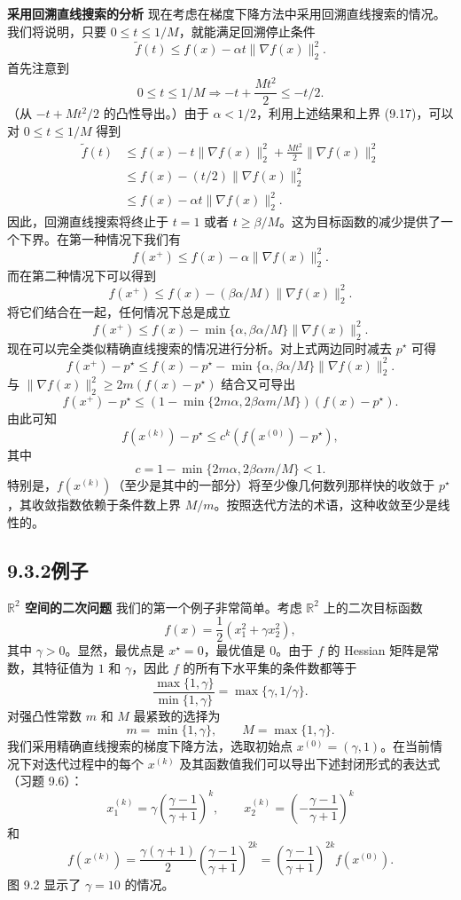 \documentclass[UTF8, 12pt, fontset=fandol, oneside]{ctexart}
\begin{document}
\noindent\textbf{采用回溯直线搜索的分析}\quad
现在考虑在梯度下降方法中采用回溯直线搜索的情况。我们将说明，只要 $0\leq t\leq 1/M$，就能满足回溯停止条件
\[
\tilde{f}(t)\leq f(x)-\alpha t\|\nabla f(x)\|_2^2.
\]
首先注意到
\[
0\leq t\leq 1/M\Longrightarrow -t+\frac{Mt^2}{2}\leq -t/2.
\]
（从 $-t+Mt^2/2$ 的凸性导出。）由于 $\alpha<1/2$，利用上述结果和上界 (9.17)，可以对 $0\leq t\leq1/M$ 得到
\[
\begin{aligned}
\tilde{f}(t)
&\leq f(x)-t\|\nabla f(x)\|_2^2+\frac{Mt^2}{2}\|\nabla f(x)\|_2^2\\
&\leq f(x)-(t/2)\|\nabla f(x)\|_2^2\\
&\leq f(x)-\alpha t\|\nabla f(x)\|_2^2.
\end{aligned}
\]
因此，回溯直线搜索将终止于 $t=1$ 或者 $t\geq \beta/M$。这为目标函数的减少提供了一个下界。在第一种情况下我们有
\[
f(x^+)\leq f(x)-\alpha\|\nabla f(x)\|_2^2.
\]
而在第二种情况下可以得到
\[
f(x^+)\leq f(x)-(\beta\alpha/M)\|\nabla f(x)\|_2^2.
\]
将它们结合在一起，任何情况下总是成立
\[
f(x^+)\leq f(x)-\min\{\alpha,\beta\alpha/M\}\|\nabla f(x)\|_2^2.
\]
现在可以完全类似精确直线搜索的情况进行分析。对上式两边同时减去 $p^\star$ 可得
\[
f(x^+)-p^\star\leq f(x)-p^\star-\min\{\alpha,\beta\alpha/M\}\|\nabla f(x)\|_2^2.
\]
与 $\|\nabla f(x)\|_2^2\geq 2m(f(x)-p^\star)$ 结合又可导出
\[
f(x^+)-p^\star\leq (1-\min\{2m\alpha,2\beta\alpha m/M\})(f(x)-p^\star).
\]
由此可知
\[
f(x^{(k)})-p^\star\leq c^k(f(x^{(0)})-p^\star),
\]
其中
\[
c=1-\min\{2m\alpha,2\beta\alpha m/M\}<1.
\]
特别是，$f(x^{(k)})$（至少是其中的一部分）将至少像几何数列那样快的收敛于 $p^\star$，其收敛指数依赖于条件数上界 $M/m$。按照迭代方法的术语，这种收敛至少是线性的。

\subsection*{9.3.2\quad 例子}

\noindent\textbf{$\mathbb{R}^2$ 空间的二次问题}\quad
我们的第一个例子非常简单。考虑 $\mathbb{R}^2$ 上的二次目标函数
\[
f(x)=\frac{1}{2}(x_1^2+\gamma x_2^2),
\]
其中 $\gamma>0$。显然，最优点是 $x^\star=0$，最优值是 $0$。由于 $f$ 的 Hessian 矩阵是常数，其特征值为 $1$ 和 $\gamma$，因此 $f$ 的所有下水平集的条件数都等于
\[
\frac{\max\{1,\gamma\}}{\min\{1,\gamma\}}=\max\{\gamma,1/\gamma\}.
\]
对强凸性常数 $m$ 和 $M$ 最紧致的选择为
\[
m=\min\{1,\gamma\},\qquad M=\max\{1,\gamma\}.
\]
我们采用精确直线搜索的梯度下降方法，选取初始点 $x^{(0)}=(\gamma,1)$。在当前情况下对迭代过程中的每个 $x^{(k)}$ 及其函数值我们可以导出下述封闭形式的表达式（习题 9.6）：
\[
x_1^{(k)}=\gamma\left(\frac{\gamma-1}{\gamma+1}\right)^k,\qquad
x_2^{(k)}=\left(-\frac{\gamma-1}{\gamma+1}\right)^k
\]
和
\[
f(x^{(k)})=\frac{\gamma(\gamma+1)}{2}\left(\frac{\gamma-1}{\gamma+1}\right)^{2k}
=\left(\frac{\gamma-1}{\gamma+1}\right)^{2k}f(x^{(0)}).
\]
图 9.2 显示了 $\gamma=10$ 的情况。
\end{document}
